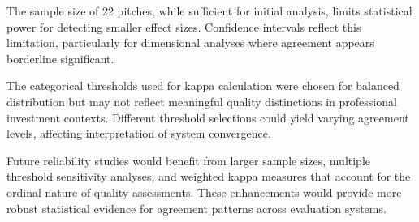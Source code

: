 The sample size of 22 pitches, while sufficient for initial analysis, limits statistical power for detecting smaller effect sizes. Confidence intervals reflect this limitation, particularly for dimensional analyses where agreement appears borderline significant.

The categorical thresholds used for kappa calculation were chosen for balanced distribution but may not reflect meaningful quality distinctions in professional investment contexts. Different threshold selections could yield varying agreement levels, affecting interpretation of system convergence.

Future reliability studies would benefit from larger sample sizes, multiple threshold sensitivity analyses, and weighted kappa measures that account for the ordinal nature of quality assessments. These enhancements would provide more robust statistical evidence for agreement patterns across evaluation systems.